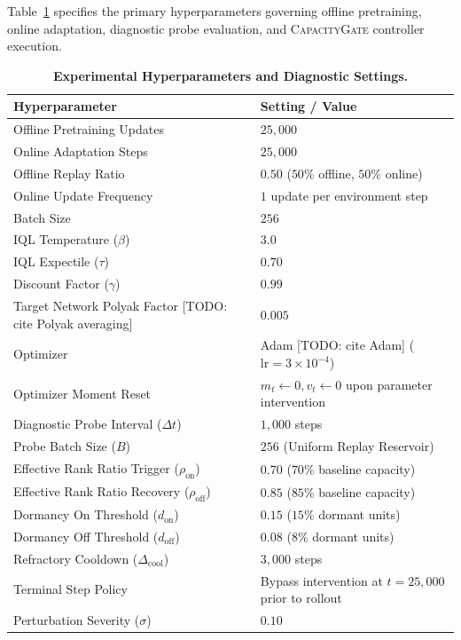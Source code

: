 \documentclass{article}
\begin{document}
Table~\ref{tab:hyperparams} specifies the primary hyperparameters governing offline pretraining, online adaptation, diagnostic probe evaluation, and \textsc{CapacityGate} controller execution.

\begin{table}[h]
\caption{\textbf{Experimental Hyperparameters and Diagnostic Settings.}}
\label{tab:hyperparams}
\centering
\small
\begin{tabular}{ll}
\toprule
\textbf{Hyperparameter} & \textbf{Setting / Value} \\
\midrule
Offline Pretraining Updates & $25,000$ \\
Online Adaptation Steps & $25,000$ \\
Offline Replay Ratio & $0.50$ ($50\%$ offline, $50\%$ online) \\
Online Update Frequency & $1$ update per environment step \\
Batch Size & $256$ \\
IQL Temperature ($\beta$) & $3.0$ \\
IQL Expectile ($\tau$) & $0.70$ \\
Discount Factor ($\gamma$) & $0.99$ \\
Target Network Polyak Factor [TODO: cite Polyak averaging] & $0.005$ \\
Optimizer & Adam [TODO: cite Adam] ($\mathrm{lr} = 3 \times 10^{-4}$) \\
Optimizer Moment Reset & $m_t \leftarrow 0, v_t \leftarrow 0$ upon parameter intervention \\
Diagnostic Probe Interval ($\Delta t$) & $1,000$ steps \\
Probe Batch Size ($B$) & $256$ (Uniform Replay Reservoir) \\
Effective Rank Ratio Trigger ($\rho_{\mathrm{on}}$) & $0.70$ ($70\%$ baseline capacity) \\
Effective Rank Ratio Recovery ($\rho_{\mathrm{off}}$) & $0.85$ ($85\%$ baseline capacity) \\
Dormancy On Threshold ($d_{\mathrm{on}}$) & $0.15$ ($15\%$ dormant units) \\
Dormancy Off Threshold ($d_{\mathrm{off}}$) & $0.08$ ($8\%$ dormant units) \\
Refractory Cooldown ($\Delta_{\mathrm{cool}}$) & $3,000$ steps \\
Terminal Step Policy & Bypass intervention at $t = 25,000$ prior to rollout \\
Perturbation Severity ($\sigma$) & $0.10$ \\

\end{tabular}
\end{table}
\end{document}
